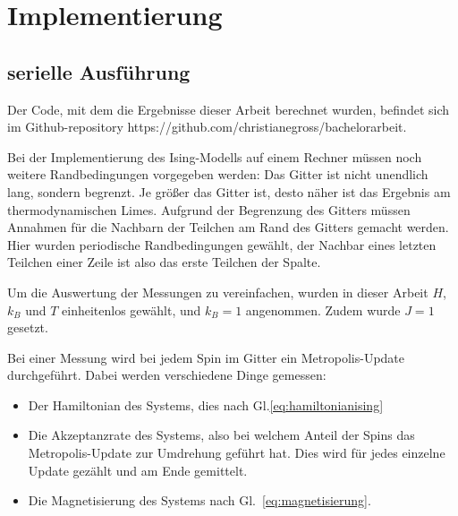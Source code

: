 	\chapter{Implementierung}
	\label{chap:implementierung}
	
	\section{serielle Ausführung}
	\label{sec:seriellimplementierung}
	
	Der Code, mit dem die Ergebnisse dieser Arbeit berechnet wurden, befindet sich im Github-repository https://github.com/christianegross/bachelorarbeit. %
	
	Bei der Implementierung des Ising-Modells auf einem Rechner müssen noch weitere Randbedingungen vorgegeben werden:
	Das Gitter ist nicht unendlich lang, sondern begrenzt. Je größer das Gitter ist, desto näher ist das Ergebnis am thermodynamischen Limes. 
	Aufgrund der Begrenzung des Gitters müssen Annahmen für die Nachbarn der Teilchen am Rand des Gitters gemacht werden. Hier wurden periodische Randbedingungen gewählt, der Nachbar eines letzten Teilchen einer Zeile ist also das erste Teilchen der Spalte.
	
	Um die Auswertung der Messungen zu vereinfachen, wurden in dieser Arbeit $H$, $k_B$ und $T$ einheitenlos gewählt, und $k_B=1$ angenommen. Zudem wurde $J=1$ gesetzt.
	
	Bei einer Messung wird bei jedem Spin im Gitter ein Metropolis-Update durchgeführt.%
	Dabei werden verschiedene Dinge gemessen: \begin{itemize}
		\item Der Hamiltonian des Systems, dies nach Gl.\ref{eq:hamiltonianising}
		\item Die Akzeptanzrate des Systems, also bei welchem Anteil der Spins das Metropolis-Update zur Umdrehung geführt hat. Dies wird für jedes einzelne Update gezählt und am Ende gemittelt.
		\item Die Magnetisierung des Systems nach Gl.~\ref{eq:magnetisierung}. 
	\end{itemize}
	
